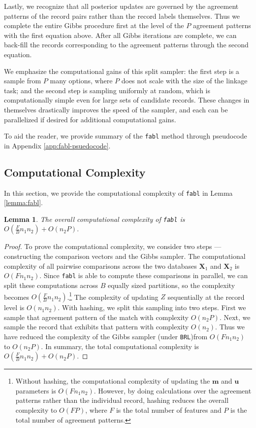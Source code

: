 \documentclass[12pt,letterpaper]{article}
\newcommand{\1}[1]{\mathbb{I}\!\left[#1\right]} %
\newtheorem*{lemma}{Lemma}
\begin{document}
Lastly, we recognize that all posterior updates are governed by the
agreement patterns of the record pairs rather than the record labels
themselves. Thus we complete the entire Gibbs procedure first at the
level of the \(P\) agreement patterns with the first equation above.
After all Gibbs iterations are complete, we can back-fill the records corresponding to the agreement patterns through the second equation.

We emphasize the computational gains of this split sampler: the first step is a sample from $P$ many options, where $P$ does not scale with the size of the linkage task; and the second step is sampling uniformly at random, which is computationally simple even for large sets of candidate records. These changes in themselves drastically improves the speed of the sampler, and each can be parallelized if desired for additional computational gains. 

To aid the reader, we provide summary of the \texttt{fabl} method through pseudocode in Appendix \ref{app:fabl-psuedocode}.



\hypertarget{computational-complexity}{%
	\subsection{Computational Complexity}\label{computational-complexity}}
In this section, we provide the computational complexity of \texttt{fabl} in Lemma \ref{lemma:fabl}. 

\newpage
\begin{lemma}
The overall computational complexity of \texttt{fabl} is $O(\frac{F}{B} n_1 n_2) + O(n_2 P).$
\end{lemma}

\begin{proof}
To prove the computational complexity, we consider two steps --- constructing the comparison vectors and the Gibbs sampler. 
%
The computational complexity of all pairwise comparisons across the two databases $\mathbf{X}_1$ and $\mathbf{X}_2$ is $O(F n_1 n_2)$. Since \texttt{fabl} is able to compute these comparisons in parallel, we can split these computations across $B$ equally sized partitions, so the complexity becomes $O(\frac{F}{B} n_1 n_2)$.\footnote{Without hashing, the computational complexity of updating the $\mathbf{m}$ and $\mathbf{u}$ parameters is $O(F n_1 n_2)$. However, by doing calculations over the agreement patterns rather than the individual record, hashing reduces the overall complexity to $O(FP)$, where $F$ is the total number of features and $P$ is the total number of agreement patterns.}
The complexity of updating $Z$ sequentially at the record level is $O(n_1 n_2)$. With hashing, we split this sampling into two steps. First we sample that agreement pattern of the match with complexity $O(n_2 P).$ Next,  we sample the record that exhibits that pattern with complexity $O(n_2)$. Thus we have reduced the complexity of the Gibbs sampler (under \texttt{BRL})from $O(F n_1 n_2)$ to $O(n_2 P)$.
In summary, the total computational complexity is $O(\frac{F}{B} n_1 n_2) + O(n_2 P).$
\end{proof} 
\end{document}
